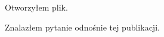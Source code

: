 \documentclass{article}
\begin{document}
Otworzyłem plik.

Znalazłem pytanie odnośnie tej publikacji.
\end{document}
